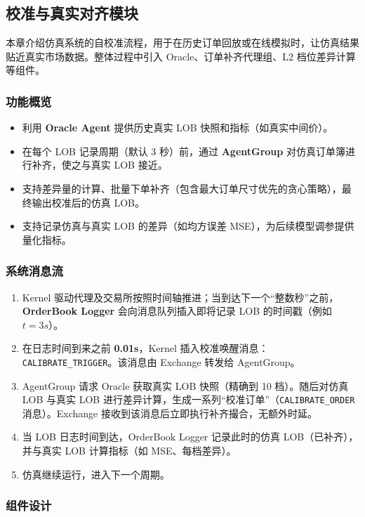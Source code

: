 \subsection{校准与真实对齐模块}

本章介绍仿真系统的自校准流程，用于在历史订单回放或在线模拟时，让仿真结果贴近真实市场数据。整体过程中引入 Oracle、订单补齐代理组、L2 档位差异计算等组件。

\subsubsection{功能概览}
\begin{itemize}
    \item 利用 \textbf{Oracle Agent} 提供历史真实 LOB 快照和指标（如真实中间价）。
    \item 在每个 LOB 记录周期（默认 3 秒）前，通过 \textbf{AgentGroup} 对仿真订单簿进行补齐，使之与真实 LOB 接近。
    \item 支持差异量的计算、批量下单补齐（包含最大订单尺寸优先的贪心策略），最终输出校准后的仿真 LOB。
    \item 支持记录仿真与真实 LOB 的差异（如均方误差 MSE），为后续模型调参提供量化指标。
\end{itemize}

\subsubsection{系统消息流}
\begin{enumerate}
    \item Kernel 驱动代理及交易所按照时间轴推进；当到达下一个“整数秒”之前，\textbf{OrderBook Logger} 会向消息队列插入即将记录 LOB 的时间戳（例如 $t=3s$）。
    \item 在日志时间到来之前 \textbf{0.01s}，Kernel 插入校准唤醒消息：\verb|CALIBRATE_TRIGGER|。该消息由 Exchange 转发给 AgentGroup。
    \item AgentGroup 请求 Oracle 获取真实 LOB 快照（精确到 10 档）。随后对仿真 LOB 与真实 LOB 进行差异计算，生成一系列“校准订单”（\verb|CALIBRATE_ORDER| 消息）。Exchange 接收到该消息后立即执行补齐撮合，无额外时延。
    \item 当 LOB 日志时间到达，OrderBook Logger 记录此时的仿真 LOB（已补齐），并与真实 LOB 计算指标（如 MSE、每档差异）。
    \item 仿真继续运行，进入下一个周期。
\end{enumerate}

\subsubsection{组件设计}
